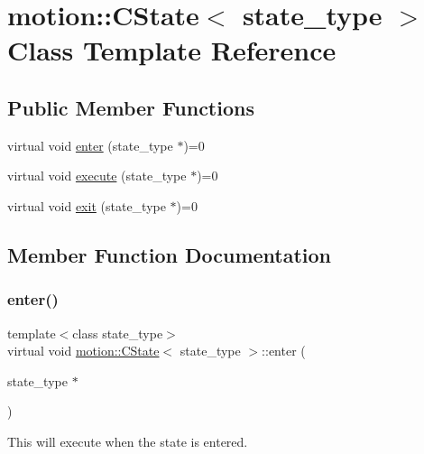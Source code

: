 \hypertarget{classmotion_1_1CState}{}\section{motion\+:\+:C\+State$<$ state\+\_\+type $>$ Class Template Reference}
\label{classmotion_1_1CState}
\subsection*{Public Member Functions}
\begin{DoxyCompactItemize}
\item 
virtual void \mbox{\hyperlink{classmotion_1_1CState_a53d5fcfec223b58ccdd364a8430fd23c}{enter}} (state\+\_\+type $\ast$)=0
\item 
virtual void \mbox{\hyperlink{classmotion_1_1CState_a71dc72d345b15bf3b5b5bff596a71f33}{execute}} (state\+\_\+type $\ast$)=0
\item 
virtual void \mbox{\hyperlink{classmotion_1_1CState_a353db064c159d66b82bf257b35e7c016}{exit}} (state\+\_\+type $\ast$)=0
\end{DoxyCompactItemize}


\subsection{Member Function Documentation}
\mbox{\label{classmotion_1_1CState_a53d5fcfec223b58ccdd364a8430fd23c}} 
\subsubsection{\texorpdfstring{enter()}{enter()}}
{\footnotesize\ttfamily template$<$class state\+\_\+type$>$ \\
virtual void \mbox{\hyperlink{classmotion_1_1CState}{motion\+::\+C\+State}}$<$ state\+\_\+type $>$\+::enter (\begin{DoxyParamCaption}\item[{state\+\_\+type $\ast$}]{ }\end{DoxyParamCaption})\hspace{0.3cm}{\ttfamily [pure virtual]}}

This will execute when the state is entered. \mbox{\label{classmotion_1_1CState_a71dc72d345b15bf3b5b5bff596a71f33}} 
